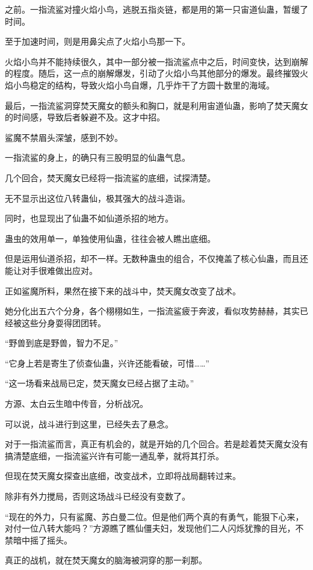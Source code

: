 \begin{this_body}
之前。一指流鲨对撞火焰小鸟，逃脱五指炎链，都是用的第一只宙道仙蛊，暂缓了时间。

至于加速时间，则是用鼻尖点了火焰小鸟那一下。

火焰小鸟并不能持续很久，其中一部分被一指流鲨点中之后，时间变快，达到崩解的程度。随后，这一点的崩解爆发，引动了火焰小鸟其他部分的爆发。最终摧毁火焰小鸟稳定的结构，导致火焰小鸟自爆，几乎炸干了方圆十数里的海域。

最后，一指流鲨洞穿焚天魔女的额头和胸口，就是利用宙道仙蛊，影响了焚天魔女的时间感，导致后者躲避不及。这才中招。

鲨魔不禁眉头深皱，感到不妙。

一指流鲨的身上，的确只有三股明显的仙蛊气息。

几个回合，焚天魔女已经将一指流鲨的底细，试探清楚。

无不显示出这位八转蛊仙，极其强大的战斗造诣。

同时，也显现出了仙蛊不如仙道杀招的地方。

蛊虫的效用单一，单独使用仙蛊，往往会被人瞧出底细。

但是运用仙道杀招，却不一样。无数种蛊虫的组合，不仅掩盖了核心仙蛊，而且还能让对手很难做出应对。

正如鲨魔所料，果然在接下来的战斗中，焚天魔女改变了战术。

她分化出五六个分身，各个栩栩如生，一指流鲨疲于奔波，看似攻势赫赫，其实已经被这些分身耍得团团转。

“野兽到底是野兽，智力不足。”

“它身上若是寄生了侦查仙蛊，兴许还能看破，可惜……”

“这一场看来战局已定，焚天魔女已经占据了主动。”

方源、太白云生暗中传音，分析战况。

可以说，战斗进行到这里，已经失去了悬念。

对于一指流鲨而言，真正有机会的，就是开始的几个回合。若是趁着焚天魔女没有搞清楚底细，一指流鲨兴许有可能一通乱拳，就将其打杀。

但现在焚天魔女探查出底细，改变战术，立即将战局翻转过来。

除非有外力搅局，否则这场战斗已经没有变数了。

“现在的外力，只有鲨魔、苏白曼二位。但是他们两个真的有勇气，能狠下心来，对付一位八转大能吗？”方源瞧了瞧仙僵夫妇，发现他们二人闪烁犹豫的目光，不禁暗中摇了摇头。

真正的战机，就在焚天魔女的脑海被洞穿的那一刹那。


\end{this_body}
